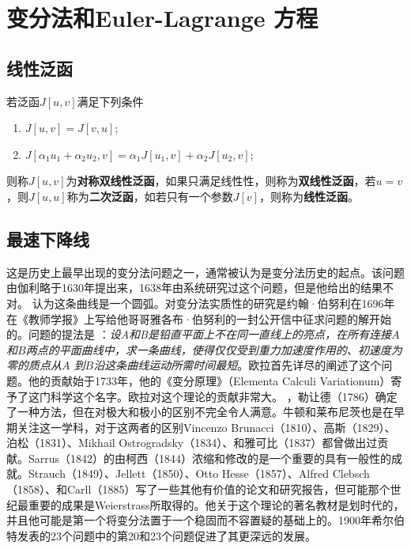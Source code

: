 \chapter{变分法和Euler-Lagrange 方程}

\section{线性泛函}

若泛函$J[u,v]$满足下列条件
\begin{enumerate}[itemindent=2em]
    \item $J[u,v]=J[v,u]$;
    \item $J[\alpha_1 u_1+\alpha_2 u_2,v]=\alpha_1 J[u_1,v]+\alpha_2 J[u_2,v]$;
\end{enumerate}

则称$J[u,v]$为\textbf{对称双线性泛函}，如果只满足线性性，则称为\textbf{双线性泛函}，若$u=v$，则$J[u,u]$称为\textbf{二次泛函}，如若只有一个参数$J[v]$，则称为\textbf{线性泛函}。


\section{最速下降线}

这是历史上最早出现的变分法问题之一，通常被认为是变分法历史的起点。该问题由伽利略于1630年提出来，1638年由系统研究过这个问题，但是他给出的结果不对。
认为这条曲线是一个圆弧。对变分法实质性的研究是约翰·伯努利在1696年在《教师学报》上写给他哥哥雅各布·伯努利的一封公开信中征求问题的解开始的。问题的提法是
：\textsl{设A和B是铅直平面上不在同一直线上的亮点，在所有连接$A$和$B$两点的平面曲线中，求一条曲线，使得仅仅受到重力加速度作用的、初速度为零的质点从$A$
到$B$沿这条曲线运动所需时间最短}。欧拉首先详尽的阐述了这个问题。他的贡献始于1733年，他的《变分原理》（Elementa Calculi Variationum）寄予了这门科学这个名字。欧拉对这个理论的贡献非常大。
，勒让德（1786）确定了一种方法，但在对极大和极小的区别不完全令人满意。牛顿和莱布尼茨也是在早期关注这一学科，对于这两者的区别Vincenzo Brunacci（1810）、高斯（1829）、泊松（1831）、Mikhail Ostrogradsky（1834）、和雅可比（1837）都曾做出过贡献。Sarrus（1842）的由柯西（1844）浓缩和修改的是一个重要的具有一般性的成就。Strauch（1849）、Jellett（1850）、Otto Hesse（1857）、Alfred Clebsch（1858）、和Carll（1885）写了一些其他有价值的论文和研究报告，但可能那个世纪最重要的成果是Weierstrass所取得的。他关于这个理论的著名教材是划时代的，并且他可能是第一个将变分法置于一个稳固而不容置疑的基础上的。1900年希尔伯特发表的23个问题中的第20和23个问题促进了其更深远的发展。

